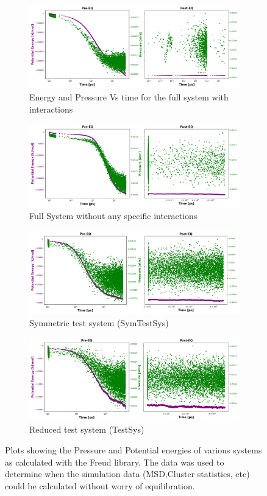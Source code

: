 \documentclass[draft, english]{volcanica-template}
\begin{document}
\begin{figure}[!htbp]
\centering
\begin{figure}[!htbp]
\centering
\includegraphics[width=0.7\linewidth]{files/EQ_stats-2e2410cf19551a48a5a7d060bb1cb330.png}
\caption[]{Energy and Pressure Vs time for the full system with interactions}
\label{Fig3}
\end{figure}

\begin{figure}[!htbp]
\centering
\includegraphics[width=0.7\linewidth]{files/EQ_stats-d94c66ce8d73889e33338bbdaaae0c3a.png}
\caption[]{Full System without any specific interactions}
\label{Fig3_EQ-b}
\end{figure}

\begin{figure}[!htbp]
\centering
\includegraphics[width=0.7\linewidth]{files/EQ_stats-dab4b4a52a7e236a63d37ef97c374df1.png}
\caption[]{Symmetric test system (SymTestSys)}
\label{Fig3_EQ-c}
\end{figure}

\begin{figure}[!htbp]
\centering
\includegraphics[width=0.7\linewidth]{files/EQ_stats-113631f66a89c9f748cb88ded108ae59.png}
\caption[]{Reduced test system (TestSys)}
\label{Fig3_EQ-d}
\end{figure}
\caption[]{Plots showing the Pressure and Potential energies of various systems as calculated with the Freud library. The data was used to determine when the simulation data (MSD,Cluster statistics, etc) could be calculated without worry of equilibration.}
\label{Fig3_EQ-d}
\end{figure}
\end{document}
